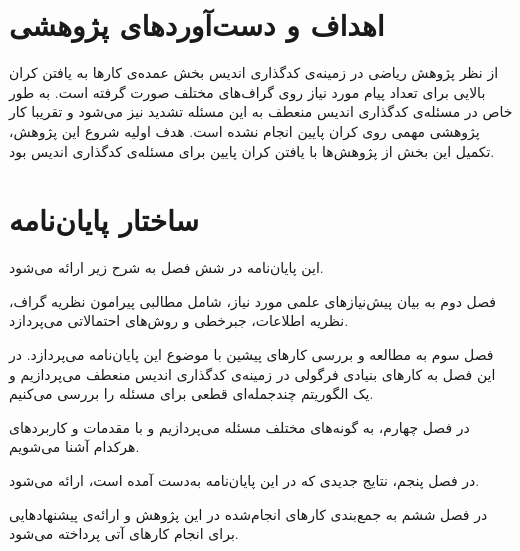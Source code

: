 \pagebreak 
\section{اهداف و دست‌آورد‌های پژوهشی}
از نظر پژوهش ریاضی در زمینه‌ی کدگذاری اندیس بخش عمده‌ی کارها به یافتن کران بالایی برای تعداد پیام مورد نیاز روی گراف‌های مختلف صورت گرفته است. به طور خاص در مسئله‌ی کدگذاری اندیس منعطف به این مسئله تشدید نیز می‌شود و تقریبا کار پژوهشی‌ مهمی روی کران پایین انجام نشده است. هدف اولیه شروع این پژوهش‌، تکمیل این بخش از پژوهش‌ها با یافتن کران پایین برای مسئله‌ی کدگذاری اندیس بود.
\section{ساختار پایان‌نامه}

این پایان‌نامه در شش فصل به شرح زیر ارائه می‌شود.

فصل دوم به بیان پیش‌نیازهای علمی مورد نیاز، شامل مطالبی پیرامون نظریه گراف، نظریه اطلاعات، جبرخطی و روش‌های احتمالاتی می‌پردازد.

فصل سوم به مطالعه و بررسی کارهای پیشین با موضوع این پایان‌نامه می‌پردازد. در این فصل به کارهای بنیادی فرگولی در زمینه‌ی کدگذاری اندیس منعطف می‌پردازیم و یک الگوریتم چندجمله‌ای قطعی برای مسئله را بررسی می‌کنیم.

در فصل چهارم، به گونه‌های مختلف مسئله می‌پردازیم و با مقدمات و کاربردهای هرکدام آشنا می‌شویم.

در فصل پنجم، نتایج جدیدی که در این پایان‌نامه به‌دست آمده است، ارائه می‌شود.

در فصل ششم به جمع‌بندی کارهای انجام‌شده در این پژوهش و ارائه‌ی پیشنهادهایی برای انجام کارهای آتی پرداخته می‌شود.
